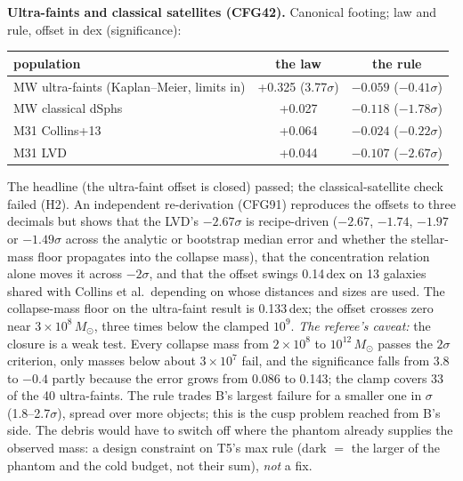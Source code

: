 \documentclass[10pt]{article}
\begin{document}
\textbf{Ultra-faints and classical satellites (CFG42).} Canonical footing; law and rule, offset in dex (significance):
\begin{center}\small
\begin{tabular}{lcc}
\toprule
population & the law & the rule \\
\midrule
MW ultra-faints (Kaplan--Meier, limits in) & +0.325 (3.77$\sigma$) & $-0.059$ ($-0.41\sigma$) \\
MW classical dSphs & +0.027 & $-0.118$ ($-1.78\sigma$) \\
M31 Collins+13 & +0.064 & $-0.024$ ($-0.22\sigma$) \\
M31 LVD & +0.044 & $-0.107$ ($-2.67\sigma$) \\
\bottomrule
\end{tabular}
\end{center}
The headline (the ultra-faint offset is closed) passed; the classical-satellite check failed (H2). An independent re-derivation (CFG91) reproduces the offsets to three decimals but shows that the LVD's $-2.67\sigma$ is recipe-driven ($-2.67$, $-1.74$, $-1.97$ or $-1.49\sigma$ across the analytic or bootstrap median error and whether the stellar-mass floor propagates into the collapse mass), that the concentration relation alone moves it across $-2\sigma$, and that the offset swings 0.14\,dex on 13 galaxies shared with Collins et al.\ depending on whose distances and sizes are used. The collapse-mass floor on the ultra-faint result is 0.133\,dex; the offset crosses zero near $3\times10^8\,M_\odot$, three times below the clamped $10^9$. \emph{The referee's caveat:} the closure is a weak test. Every collapse mass from $2\times10^8$ to $10^{12}\,M_\odot$ passes the $2\sigma$ criterion, only masses below about $3\times10^7$ fail, and the significance falls from 3.8 to $-0.4$ partly because the error grows from 0.086 to 0.143; the clamp covers 33 of the 40 ultra-faints. The rule trades B's largest failure for a smaller one in $\sigma$ (1.8--2.7$\sigma$), spread over more objects; this is the cusp problem reached from B's side. The debris would have to switch off where the phantom already supplies the observed mass: a design constraint on T5's max rule (dark $=$ the larger of the phantom and the cold budget, not their sum), \emph{not} a fix.
\end{document}
